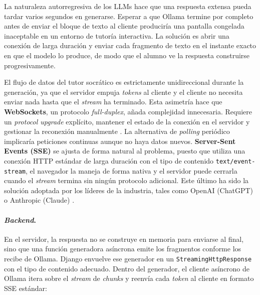 La naturaleza autorregresiva de los LLMs hace que una respuesta extensa pueda tardar varios segundos en generarse. Esperar a que Ollama termine por completo antes de enviar el bloque de texto al cliente produciría una pantalla congelada inaceptable en un entorno de tutoría interactiva. La solución es abrir una conexión de larga duración y enviar cada fragmento de texto en el instante exacto en que el modelo lo produce, de modo que el alumno ve la respuesta construirse progresivamente.

El flujo de datos del tutor socrático es estrictamente unidireccional durante la generación, ya que el servidor empuja \textit{tokens} al cliente y el cliente no necesita enviar nada hasta que el \textit{stream} ha terminado. Esta asimetría hace que \textbf{WebSockets}, un protocolo \textit{full-duplex}, añada complejidad innecesaria. Requiere un \textit{protocol upgrade} explícito, mantener el estado de la conexión en el servidor y gestionar la reconexión manualmente \cite{mackovivccomparative}. La alternativa de \textit{polling} periódico implicaría peticiones continuas aunque no haya datos nuevos. \textbf{Server-Sent Events (SSE)} se ajusta de forma natural al problema, puesto que utiliza una conexión HTTP estándar de larga duración con el tipo de contenido \texttt{text/event-stream}, el navegador la maneja de forma nativa y el servidor puede cerrarla cuando el \textit{stream} termina sin ningún protocolo adicional. Este último ha sido la solución adoptada por los líderes de la industria, tales como OpenAI (ChatGPT) o Anthropic (Claude) \cite{openai_streaming_2024, anthropic_streaming_2024}.

\paragraph{\textit{Backend}.}

En el servidor, la respuesta no se construye en memoria para enviarse al final, sino que una función generadora asíncrona emite los fragmentos conforme los recibe de Ollama. Django envuelve ese generador en un \texttt{StreamingHttpResponse} con el tipo de contenido adecuado. Dentro del generador, el cliente asíncrono de Ollama itera sobre el \textit{stream} de \textit{chunks} y reenvía cada \textit{token} al cliente en formato SSE estándar:


